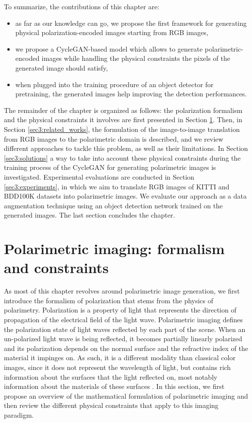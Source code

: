 To summarize, the contributions of this chapter are:
\vspace{-10px}
\begin{itemize}
	\itemsep0em
	\item as far as our knowledge can go, we propose the first framework for generating physical polarization-encoded images starting from RGB images, 
	\item we propose a \ac{CycleGAN}-based model which allows to generate polarimetric-encoded images while handling the physical constraints the pixels of the generated image should satisfy,
	\item when plugged into the training procedure of an object detector for pretraining, the generated images help improving the detection performances.
\end{itemize}

The remainder of the chapter is organized as follows:  the polarization formalism and the physical constraints it involves are first presented in Section \ref{sec3:physical_prop}. Then, in Section \ref{sec3:related_works}, the formulation of the image-to-image translation from \ac{RGB} images to the polarimetric domain is described, and we review different approaches to tackle this problem, as well as their limitations. In Section \ref{sec3:solutions} a way to take into account these physical constraints during the training process of the CycleGAN for generating polarimetric images is investigated. Experimental evaluations are conducted in Section \ref{sec3:experiments}, in which we aim to translate RGB images of KITTI and BDD100K datasets into polarimetric images. We evaluate our approach as a data augmentation technique using an object detection network trained on the generated images. The last section concludes the chapter.

\section{Polarimetric imaging: formalism and constraints}
\label{sec3:physical_prop}

As most of this chapter revolves around polarimetric image generation, we first introduce the formalism of polarization that stems from the physics of polarimetry.  Polarization is a property of light that represents the direction of propagation of the electrical field of the light wave. Polarimetric imaging defines the polarization state of light waves reflected by each part of the scene. When an un-polarized light wave is being reflected, it becomes partially linearly polarized and its polarization depends on the normal surface  and the refractive index of the material it impinges on. As such, it is a different modality than classical color images, since it does not represent the wavelength of light, but contains rich information about the surfaces that the light reflected on, most notably information about the materials of these surfaces \citep{Gross2012}. In this section, we first propose an overview of the mathematical formulation of polarimetric imaging and then review the different physical constraints that apply to this imaging paradigm.

